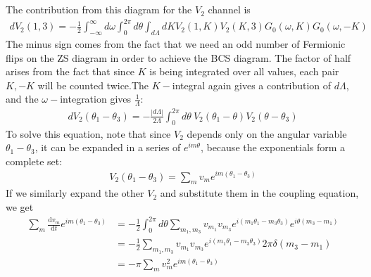 \documentclass[14pt]{extarticle}
\begin{document}
\\\\
The contribution from this diagram for the \(V_2\) channel is
\begin{equation}\begin{aligned}
	dV_2(1,3) = -\frac{1}{2}\int_{-\infty}^\infty d\omega  \int_0^{2\pi} d\theta \int_{d\Lambda}dK V_2(1,K) V_2(K, 3) G_0(\omega, K)G_0(\omega, -K)
\end{aligned}\end{equation}
The minus sign comes from the fact that we need an odd number of Fermionic flips on the ZS diagram in order to achieve the BCS diagram. The factor of half arises from the fact that since \(K\) is being integrated over all values, each pair \(K, -K\) will be counted twice.The \(K-\)integral again gives a contribution of \(d\Lambda\), and the \(\omega-\)integration gives \(\frac{1}{\Lambda}\):
\begin{equation}\begin{aligned}
	dV_2(\theta_1 - \theta_3) = -\frac{|d\Lambda|}{2\Lambda}  \int_0^{2\pi} d\theta~ V_2(\theta_1 - \theta) V_2(\theta - \theta_3)
\end{aligned}\end{equation}
To solve this equation, note that since \(V_2\) depends only on the angular variable \(\theta_1 - \theta_3\), it can be expanded in a series of \(e^{im\theta}\), because the exponentials form a complete set:
\begin{equation}\begin{aligned}
	V_2(\theta_1 - \theta_3) = \sum_m v_m e^{im\left(\theta_1 - \theta_3\right)}
\end{aligned}\end{equation}
If we similarly expand the other \(V_2\) and substitute them in the coupling equation, we get
\begin{equation}\begin{aligned}
	\sum_m \frac{\mathrm{d}v_m}{\mathrm{d}t} e^{im\left(\theta_1 - \theta_3\right)} &= -\frac{1}{2}\int_0^{2\pi} d\theta \sum_{m_1,m_3}v_{m_1}v_{m_3}e^{i\left(m_1\theta_1 - m_3\theta_3\right)}e^{i\theta\left(m_3 - m_1\right)}\\
											   &=-\frac{1}{2}\sum_{m_1,m_3}v_{m_1}v_{m_3}e^{i\left(m_1\theta_1 - m_3\theta_3\right)}2\pi \delta\left(m_3 - m_1\right)\\
											   &=-\pi\sum_{m}v_m^2e^{im\left(\theta_1 - \theta_3\right)}\\
\end{aligned}\end{equation}
\end{document}

